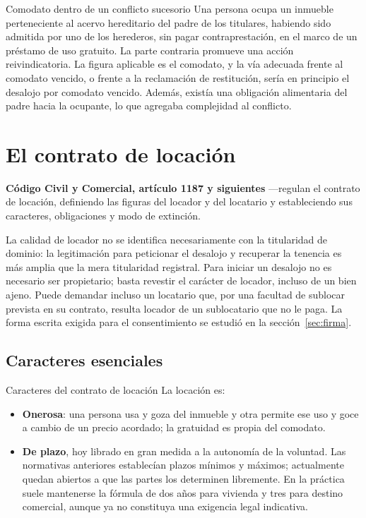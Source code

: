 \documentclass[12pt,oneside]{book}
\begin{document}
\begin{example}{Comodato dentro de un conflicto sucesorio}
Una persona ocupa un inmueble perteneciente al acervo hereditario del padre de los titulares, habiendo sido admitida por uno de los herederos, sin pagar contraprestación, en el marco de un préstamo de uso gratuito. La parte contraria promueve una acción reivindicatoria. La figura aplicable es el comodato, y la vía adecuada frente al comodato vencido, o frente a la reclamación de restitución, sería en principio el desalojo por comodato vencido. Además, existía una obligación alimentaria del padre hacia la ocupante, lo que agregaba complejidad al conflicto.
\end{example}

\section{El contrato de locación}\label{sec:locacion}

\begin{normacitada}
\textbf{Código Civil y Comercial, artículo 1187 y siguientes} ---regulan el contrato de locación, definiendo las figuras del locador y del locatario y estableciendo sus caracteres, obligaciones y modo de extinción.
\end{normacitada}

La calidad de locador no se identifica necesariamente con la titularidad de dominio: la legitimación para peticionar el desalojo y recuperar la tenencia es más amplia que la mera titularidad registral. Para iniciar un desalojo no es necesario ser propietario; basta revestir el carácter de locador, incluso de un bien ajeno. Puede demandar incluso un locatario que, por una facultad de sublocar prevista en su contrato, resulta locador de un sublocatario que no le paga. La forma escrita exigida para el consentimiento se estudió en la sección~\ref{sec:firma}.

\subsection{Caracteres esenciales}

\begin{definition}{Caracteres del contrato de locación}
La locación es:
\begin{itemize}
\item \textbf{Onerosa}: una persona usa y goza del inmueble y otra permite ese uso y goce a cambio de un precio acordado; la gratuidad es propia del comodato.
\item \textbf{De plazo}, hoy librado en gran medida a la autonomía de la voluntad. Las normativas anteriores establecían plazos mínimos y máximos; actualmente quedan abiertos a que las partes los determinen libremente. En la práctica suele mantenerse la fórmula de dos años para vivienda y tres para destino comercial, aunque ya no constituya una exigencia legal indicativa.
\end{itemize}
\end{definition}
\end{document}
